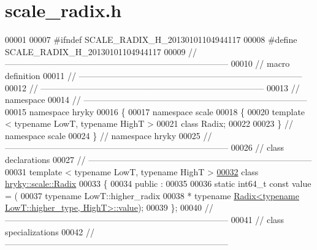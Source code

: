 \hypertarget{scale__radix_8h_source}{\section{scale\-\_\-radix.\-h}
}

\begin{DoxyCode}
00001 
00007 \textcolor{preprocessor}{#ifndef SCALE\_RADIX\_H\_20130101104944117}
00008 \textcolor{preprocessor}{}\textcolor{preprocessor}{#define SCALE\_RADIX\_H\_20130101104944117}
00009 \textcolor{preprocessor}{}\textcolor{comment}{//
      ------------------------------------------------------------------------------}
00010 \textcolor{comment}{// macro definition}
00011 \textcolor{comment}{//
      ------------------------------------------------------------------------------}
00012 \textcolor{comment}{//
      ------------------------------------------------------------------------------}
00013 \textcolor{comment}{// namespace}
00014 \textcolor{comment}{//
      ------------------------------------------------------------------------------}
00015 \textcolor{keyword}{namespace }hryky
00016 \{
00017 \textcolor{keyword}{namespace }scale
00018 \{
00020     \textcolor{keyword}{template} < \textcolor{keyword}{typename} LowT, \textcolor{keyword}{typename} HighT >
00021     \textcolor{keyword}{class }Radix;
00022 
00023 \} \textcolor{comment}{// namespace scale}
00024 \} \textcolor{comment}{// namespace hryky}
00025 \textcolor{comment}{//
      ------------------------------------------------------------------------------}
00026 \textcolor{comment}{// class declarations}
00027 \textcolor{comment}{//
      ------------------------------------------------------------------------------}
00031 \textcolor{comment}{}\textcolor{keyword}{template} < \textcolor{keyword}{typename} LowT, \textcolor{keyword}{typename} HighT >
\hypertarget{scale__radix_8h_source_l00032}{}\hyperlink{classhryky_1_1scale_1_1_radix}{00032} \textcolor{keyword}{class }\hyperlink{classhryky_1_1scale_1_1_radix}{hryky::scale::Radix}
00033 \{
00034 \textcolor{keyword}{public} :
00035 
00036     \textcolor{keyword}{static} int64\_t \textcolor{keyword}{const} value = (
00037         \textcolor{keyword}{typename} LowT::higher\_radix
00038         * \textcolor{keyword}{typename} \hyperlink{classhryky_1_1scale_1_1_radix}{Radix<typename LowT::higher_type, HighT>::value});
00039 \};
00040 \textcolor{comment}{//
      ------------------------------------------------------------------------------}
00041 \textcolor{comment}{// class specializations}
00042 \textcolor{comment}{//
      ------------------------------------------------------------------------------}

\end{DoxyCode}
